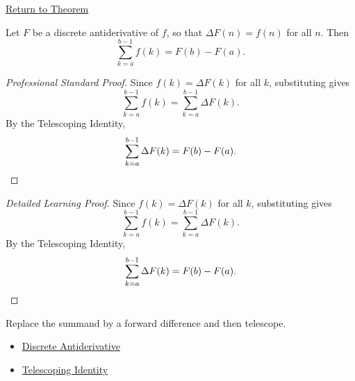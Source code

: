 \newpage
{}
\label{prf:fundamental-theorem-finite-calculus}

\begin{remark*}[Return]
\hyperref[thm:fundamental-theorem-finite-calculus]{Return to Theorem}
\end{remark*}

\begin{theorem*}
Let \(F\) be a discrete antiderivative of \(f\), so that
\(\Delta F(n) = f(n)\) for all \(n\). Then
\[
\sum_{k=a}^{b-1} f(k) = F(b) - F(a).
\]
\end{theorem*}

\begin{proof}[Professional Standard Proof]
\LRAProofBodyStart
Since \(f(k) = \Delta F(k)\) for all \(k\), substituting gives
\[
\sum_{k=a}^{b-1} f(k)
=
\sum_{k=a}^{b-1} \Delta F(k).
\]
By the Telescoping Identity,
\[
\sum_{k=a}^{b-1} \Delta F(k) = F(b) - F(a). \qedhere
\]
\end{proof}

\begin{proof}[Detailed Learning Proof]
\LRAProofBodyStart
Since \(f(k) = \Delta F(k)\) for all \(k\), substituting gives
\[
\sum_{k=a}^{b-1} f(k)
=
\sum_{k=a}^{b-1} \Delta F(k).
\]
By the Telescoping Identity,
\[
\sum_{k=a}^{b-1} \Delta F(k) = F(b) - F(a). \qedhere
\]
\end{proof}

\begin{remark*}
Replace the summand by a forward difference and then telescope.
\end{remark*}

\begin{dependencies}
\begin{itemize}
  \item \hyperref[def:discrete-antiderivative]{Discrete Antiderivative}
  \item \hyperref[thm:telescoping-identity]{Telescoping Identity}
\end{itemize}
\end{dependencies}
\clearpage
